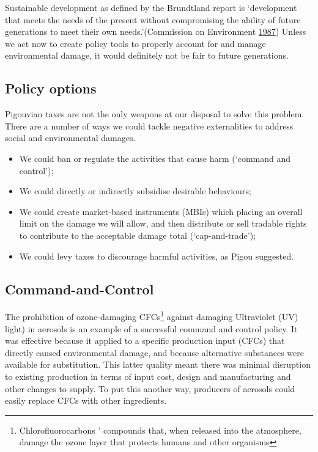 \documentclass[]{tufte-handout}
\begin{document}
Sustainable development as defined by the Brundtland report is
`development that meets the needs of the present without compromising
the ability of future generations to meet their own needs.'(Commission
on Environment \protect\hyperlink{ref-CommissiononEnvironment}{1987})
Unless we act now to create policy tools to properly account for and
manage environmental damage, it would definitely not be fair to future
generations.

\hypertarget{policy-options}{%
\subsection{Policy options}\label{policy-options}}

Pigouvian taxes are not the only weapons at our disposal to solve this
problem. There are a number of ways we could tackle negative
externalities to address social and environmental damages.

\begin{itemize}
\item
  We could ban or regulate the activities that cause harm (`command and
  control');
\item
  We could directly or indirectly subsidise desirable behaviours;
\item
  We could create market-based instruments (MBIs) which placing an
  overall limit on the damage we will allow, and then distribute or sell
  tradable rights to contribute to the acceptable damage total
  (`cap-and-trade');
\item
  We could levy taxes to discourage harmful activities, as Pigou
  suggested.
\end{itemize}

\hypertarget{command-and-control}{%
\subsection{Command-and-Control}\label{command-and-control}}

The prohibition of ozone-damaging CFCs\footnote{Chlorofluorocarbons '
  compounds that, when released into the atmosphere, damage the ozone
  layer that protects humans and other organisms} against damaging
Ultraviolet (UV) light) in aerosols is an example of a successful
command and control policy. It was effective because it applied to a
specific production input (CFCs) that directly caused environmental
damage, and because alternative substances were available for
substitution. This latter quality meant there was minimal disruption to
existing production in terms of input cost, design and manufacturing and
other changes to supply. To put this another way, producers of aerosols
could easily replace CFCs with other ingredients.
\end{document}
